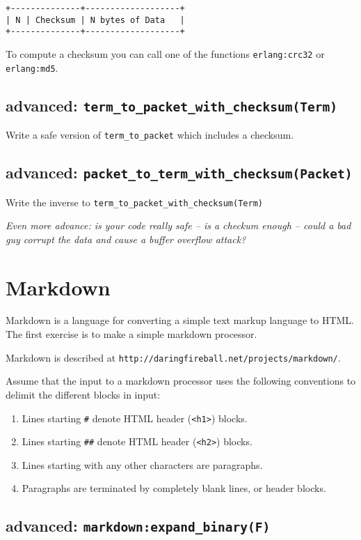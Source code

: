 \documentclass[12pt]{hitec}
\begin{document}
\begin{verbatim}
+--------------+-------------------+
| N | Checksum | N bytes of Data   |
+--------------+-------------------+
\end{verbatim}

To compute a checksum you can call one of the functions
\verb+erlang:crc32+ or \verb+erlang:md5+.


\subsection{advanced: \texttt{term\_to\_packet\_with\_checksum(Term)}}
Write a safe version of \verb+term_to_packet+ which includes a checksum.

\subsection{advanced: \texttt{packet\_to\_term\_with\_checksum(Packet)}}
Write the inverse to \verb+term_to_packet_with_checksum(Term)+

{\sl Even more advance: is your code really safe -- is a checkum
  enough -- could a bad guy corrupt the data and cause a buffer
  overflow attack?}

\section{Markdown}

Markdown is a language for converting a simple text markup language
to HTML. The first exercise is to make a simple markdown processor.

Markdown is described at
\verb+http://daringfireball.net/projects/markdown/+.

Assume that the input to a markdown processor uses the following
conventions to delimit the different blocks in input:

\begin{enumerate}
\item Lines starting \verb+#+ denote HTML header (\verb+<h1>+) blocks.
\item Lines starting \verb+##+ denote HTML header (\verb+<h2>+) blocks.
\item Lines starting with any other characters are paragraphs.
\item Paragraphs are terminated by completely blank lines, or header blocks.
\end{enumerate}

\subsection{advanced: \texttt{markdown:expand\_binary(F)}}
\end{document}
